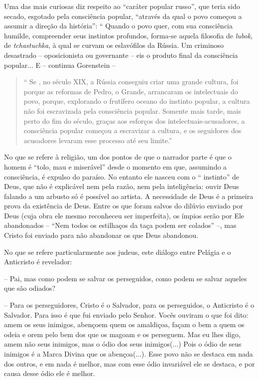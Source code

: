 Uma das mais curiosas diz respeito ao ``caráter popular russo'', que
teria sido secado, esgotado pela consciência popular, ``através da qual
o povo começou a assumir a direção da história'': `` Quando o povo quer,
com sua consciência humilde, compreender seus instintos profundos,
forma-se aquela filosofia de \emph{lubok}, de \emph{tchastuchka}, à qual
se curvam os eslavófilos da Rússia. Um criminoso desastrado --
oposicionista ou governante -- eis o produto final da consciência
popular... E -- continua Gorenstein --

\begin{quote}
`` Se , no século XIX, a Rússia conseguiu criar uma grande cultura, foi
porque as reformas de Pedro, o Grande, arrancaram os intelectuais do
povo, porque, explorando o frutífero oceano do instinto popular, a
cultura não foi escravizada pela consciência popular. Somente mais
tarde, mais perto do fim do século, graças aos esforços dos
intelectuais-acusadores, a consciência popular começou a escravizar a
cultura, e os seguidores dos acusadores levaram esse processo até seu
limite.''
\end{quote}

No que se refere à religião, um dos pontos de que o narrador parte é que
o homem é ``tolo, mau e miserável'' desde o momento em que, assumindo a
consciência, é expulso do paraíso. No entanto ele nasceu com o ``
instinto'' de Deus, que não é explicável nem pela razão, nem pela
inteligência: ouvir Deus falando a um arbusto só é possível ao artista.
A necessidade de Deus é a primeira prova da existência de Deus. Entre os
que foram salvos do dilúvio enviado por Deus (cuja obra ele mesmo
reconheceu ser imperfeita), os ímpios serão por Ele abandonados -- ``Nem
todos os estilhaços da taça podem ser colados'' --, mas Cristo foi
enviado para não abandonar os que Deus abandonou.

No que se refere particularmente aos judeus, este diálogo entre Pelágia
e o Anticristo é revelador:

-- Pai, mas como podem se salvar os perseguidos, como podem se salvar
aqueles que são odiados?

-- Para os perseguidores, Cristo é o Salvador, para os perseguidos, o
Anticristo é o Salvador. Para isso é que fui enviado pelo Senhor. Vocês
ouviram o que foi dito: amem os seus inimigos, abençoem quem os
amaldiçoa, façam o bem a quem os odeia e orem pelo bem dos que os magoam
e os perseguem. Mas eu lhes digo, amem não seus inimigos, mas o ódio dos
seus inimigos(...) Pois o ódio de seus inimigos é a Marca Divina que os
abençoa(...). Esse povo não se destaca em nada dos outros, e em nada é
melhor, mas com esse ódio invariável ele se destaca, e por causa desse
ódio ele é melhor.

